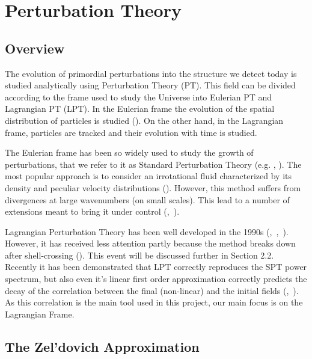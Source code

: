 

\section{Perturbation Theory}

\subsection{Overview}

The evolution of primordial perturbations into the structure we detect today is studied analytically using Perturbation Theory (PT). This field can be divided according to the frame used to study the Universe into Eulerian PT and Lagrangian PT (LPT). In the Eulerian frame the evolution of the spatial distribution of particles is studied (\cite{Bernardeau_PT}). On the other hand, in the Lagrangian frame, particles are tracked and their evolution with time is studied.

The Eulerian frame has been so widely used to study the growth of perturbations, that we refer to it as Standard Perturbation Theory (e.g. \cite{1983MNRAS.203..345V}, \cite{peebles1980large}). The most popular approach is to consider an irrotational fluid characterized by its density and peculiar velocity distributions (\cite{Carlson_perturbation_theory}). However, this method suffers from divergences at large wavenumbers (on small scales). This lead to a number of extensions meant to bring it under control (\cite{2006PhRvD..73f3519C},~\cite{2008PhRvD..77b3533C}). 

Lagrangian Perturbation Theory has been well developed in the 1990s (\cite{1992MNRAS.254..729B},~\cite{1993MNRAS.264..375B},~\cite{1994MNRAS.267..811B}). However, it has received less attention partly because the method breaks down after shell-crossing (\cite{Carlson_perturbation_theory}). This event will be discussed further in Section 2.2. Recently it has been demonstrated that LPT correctly reproduces the SPT power spectrum, but also even it's linear first order approximation correctly predicts the decay of the correlation between the final (non-linear) and the initial fields (\cite{2008PhRvD..77f3530M},~\cite{2008PhRvD..78h3519M}). As this correlation is the main tool used in this project, our main focus is on the Lagrangian Frame. 

\subsection{The Zel'dovich Approximation}

